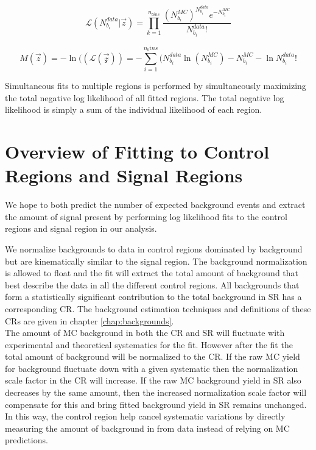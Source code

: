 \begin{equation}
\label{eqn:binnedlikelihood2}
{\mathcal{L}}(N^{data}_{b_i}|\vec{z}) = {\displaystyle\prod_{k=1}^{n_{bins}} \frac{(N^{MC}_{b_i})^{N^{data}_{b_i}}e^{-N^{MC}_{b_i}}}{N^{data}_{b_i}!}}
\end{equation}

\begin{equation}
\label{eqn:binnedNLL2}
M(\vec{z})=-\ln(({\mathcal{L(\vec{z})}}) = -{\displaystyle\sum_{i=1}^{n_bins}} ( N^{data}_{b_i} \ln( N^{MC}_{b_i} ) - N^{MC}_{b_i} - \ln{N^{data}_{b_i}!}
\end{equation}

\indent Simultaneous fits to multiple regions is performed by simultaneously maximizing the total negative log likelihood of all fitted regions.  The total negative log likelihood is simply a sum of the individual likelihood of each region.  \\

\section{Overview of Fitting to Control Regions and Signal Regions}
\label{sec:stat:Bkg}

\indent We hope to both predict the number of expected background events and extract the amount of signal present by performing log likelihood fits to the control regions and signal region in our analysis.  

\indent We normalize backgrounds to data in control regions dominated by background but are kinematically similar to the signal region.  The background normalization is allowed to float and the fit will extract the total amount of background that best describe the data in all the different control regions. All backgrounds that form a statistically significant contribution to the total background in SR has a corresponding CR.  The background estimation techniques and definitions of these CRs are given in chapter \ref{chap:backgrounds}.  \\

\indent The amount of MC background in both the CR and SR will fluctuate with experimental and theoretical systematics for the fit.  However after the fit the total amount of background will be normalized to the CR.  If the raw MC yield for background fluctuate down with a given systematic then the normalization scale factor in the CR will increase.  If the raw MC background yield in SR also decreases by the same amount, then the increased normalization scale factor will compensate for this and bring fitted background yield in SR remains unchanged.  In this way, the control region help cancel systematic variations by directly measuring the amount of background in from data instead of relying on MC predictions.  \\

